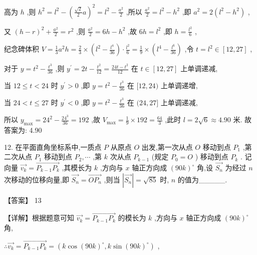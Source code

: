 \documentclass[10pt]{article}
\begin{document}
高为 \(h\) ,则 \({h}^{2} = {l}^{2} - {\left( \frac{\sqrt{2}}{2}a\right) }^{2} = {l}^{2} - \frac{{a}^{2}}{2}\) ,所以 \(\frac{{a}^{2}}{2} = {l}^{2} - {h}^{2}\) ,即 \({a}^{2} = 2\left( {{l}^{2} - {h}^{2}}\right)\) ,

又 \({\left( h - r\right) }^{2} + \frac{{a}^{2}}{2} = {r}^{2}\) ,则 \(\frac{{a}^{2}}{2} = {6h} - {h}^{2}\) ,故 \({6h} = {l}^{2}\) ,即 \(h = \frac{{l}^{2}}{6}\) ,

纪念碑体积 \(V = \frac{1}{3}{a}^{2}h = \frac{2}{3} \times  \left( {{l}^{2} - \frac{{l}^{4}}{36}}\right)  \cdot  \frac{{l}^{2}}{6} = \frac{1}{9} \times  \left( {{l}^{4} - \frac{{l}^{6}}{36}}\right)\) ,令 \(t = {l}^{2} \in  \left\lbrack  {{12},{27}}\right\rbrack\) ,

对于 \(y = {t}^{2} - \frac{{t}^{3}}{36}\) ,则 \({y}^{\prime } = {2t} - \frac{{t}^{2}}{12} = \frac{{24t} - {t}^{2}}{12}\) 在 \(t \in  \left\lbrack  {{12},{27}}\right\rbrack\) 上单调递减,

当 \({12} \leq  t < {24}\) 时 \({y}^{\prime } > 0\) ,即 \(y = {t}^{2} - \frac{{t}^{3}}{36}\) 在 \(\lbrack {12},{24})\) 上单调递增,

当 \({24} < t \leq  {27}\) 时 \({y}^{\prime } < 0\) ,即 \(y = {t}^{2} - \frac{{t}^{3}}{36}\) 在 \(({24},{27}\rbrack\) 上单调递减,

所以 \({y}_{\max } = {24}^{2} - \frac{{24}^{3}}{36} = {192}\) ,故 \({V}_{\max } = \frac{1}{9} \times  {192} = \frac{64}{3}\) ,此时 \(l = 2\sqrt{6} \approx  {4.90}\) 米. 故答案为: 4.90

12. 在平面直角坐标系中,一质点 \(P\) 从原点 \(O\) 出发,第一次从点 \(O\) 移动到点 \({P}_{1}\) ,第二次从点 \({P}_{1}\) 移动到点 \({P}_{2},\cdots\) ,第 \(k\) 次从点 \({P}_{k - 1}\) (规定 \({P}_{0} = O\) ) 移动到点 \({P}_{k}\) . 记向量 \(\overrightarrow{{v}_{k}} = \overrightarrow{{P}_{k - 1}{P}_{k}}\) ,其模长为 \(k\) ,方向与 \(x\) 轴正方向成 \({\left( {90}k\right) }^{ \circ  }\) 角,设 \(\overrightarrow{{S}_{n}}\) 为经过 \(n\) 次移动的位移向量,即 \(\overrightarrow{{S}_{n}} = \overrightarrow{O{P}_{n}}\) ,则当 \(\left| \overrightarrow{{S}_{n}}\right|  = \sqrt{85}\) 时, \(n\) 的值为\_\_\_\_\_.

【答案】 13

【详解】根据题意可知 \(\overrightarrow{{v}_{k}} = \overrightarrow{{P}_{k - 1}{P}_{k}}\) 的模长为 \(k\) ,方向与 \(x\) 轴正方向成 \({\left( {90}k\right) }^{ \circ  }\) 角,

\(\therefore \overrightarrow{{v}_{k}} = \overrightarrow{{P}_{k - 1}{P}_{k}} = \left( {k\cos {\left( {90}k\right) }^{ \circ  },k\sin {\left( {90}k\right) }^{ \circ  }}\right)\) ,
\end{document}
